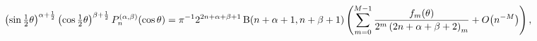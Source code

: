 \[\left(\mathop{\sin\/}\nolimits\tfrac{1}{2}\theta\right)^{\alpha+\frac{1}{2}}%
\left(\mathop{\cos\/}\nolimits\tfrac{1}{2}\theta\right)^{\beta+\frac{1}{2}}%
\mathop{P^{(\alpha,\beta)}_{n}\/}\nolimits\!\left(\mathop{\cos\/}\nolimits%
\theta\right)=\pi^{-1}2^{2n+\alpha+\beta+1}\mathop{\mathrm{B}\/}\nolimits\!%
\left(n+\alpha+1,n+\beta+1\right)\*\left(\sum_{m=0}^{M-1}\frac{f_{m}(\theta)}{%
2^{m}\left(2n+\alpha+\beta+2\right)_{m}}+\mathop{O\/}\nolimits\!\left(n^{-M}%
\right)\right),\]